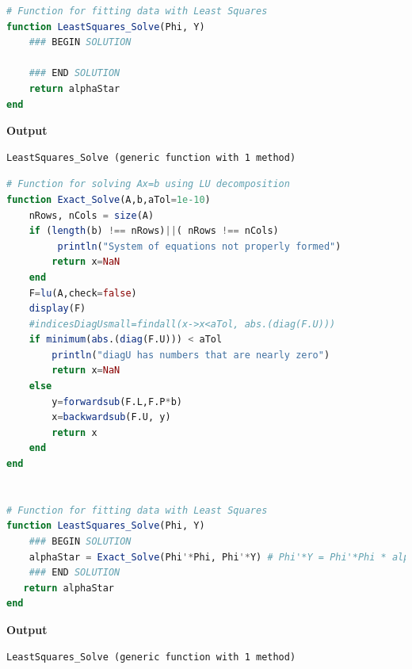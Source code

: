 \begin{lstlisting}[language=Julia,style=mystyle]
# Function for fitting data with Least Squares
function LeastSquares_Solve(Phi, Y)
    ### BEGIN SOLUTION

    ### END SOLUTION
    return alphaStar
end
\end{lstlisting}
\textbf{Output} 
\begin{verbatim}
LeastSquares_Solve (generic function with 1 method)
\end{verbatim}

\begin{lstlisting}[language=Julia,style=mystyle]
# Function for solving Ax=b using LU decomposition
function Exact_Solve(A,b,aTol=1e-10)
    nRows, nCols = size(A)
    if (length(b) !== nRows)||( nRows !== nCols)
         println("System of equations not properly formed")
        return x=NaN
    end
    F=lu(A,check=false)
    display(F)
    #indicesDiagUsmall=findall(x->x<aTol, abs.(diag(F.U)))
    if minimum(abs.(diag(F.U))) < aTol
        println("diagU has numbers that are nearly zero")
        return x=NaN 
    else
        y=forwardsub(F.L,F.P*b)
        x=backwardsub(F.U, y)
        return x 
    end
end


# Function for fitting data with Least Squares
function LeastSquares_Solve(Phi, Y)
    ### BEGIN SOLUTION
    alphaStar = Exact_Solve(Phi'*Phi, Phi'*Y) # Phi'*Y = Phi'*Phi * alpha
    ### END SOLUTION    
   return alphaStar
end
\end{lstlisting}
\textbf{Output} 
\begin{verbatim}
LeastSquares_Solve (generic function with 1 method)
\end{verbatim}








